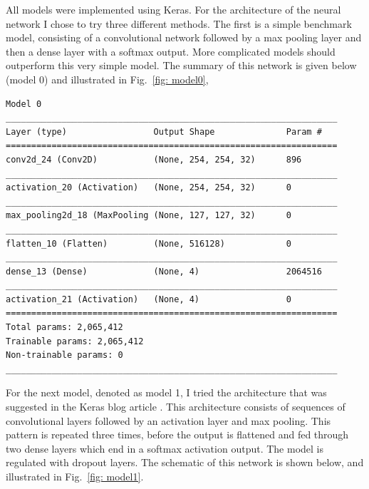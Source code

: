 \documentclass[10pt,a4paper]{article}
\begin{document}
All models were implemented using Keras. For the architecture of the neural network I chose to try three different methods. The first is a simple benchmark model, consisting of a convolutional network followed by a max pooling layer and then a dense layer with a softmax output. More complicated models should outperform this very simple model. The summary of this network is given below (model 0) and illustrated in Fig.~\ref{fig: model0},\\
\begin{lstlisting}
Model 0
_________________________________________________________________
Layer (type)                 Output Shape              Param #   
=================================================================
conv2d_24 (Conv2D)           (None, 254, 254, 32)      896       
_________________________________________________________________
activation_20 (Activation)   (None, 254, 254, 32)      0         
_________________________________________________________________
max_pooling2d_18 (MaxPooling (None, 127, 127, 32)      0         
_________________________________________________________________
flatten_10 (Flatten)         (None, 516128)            0         
_________________________________________________________________
dense_13 (Dense)             (None, 4)                 2064516   
_________________________________________________________________
activation_21 (Activation)   (None, 4)                 0         
=================================================================
Total params: 2,065,412
Trainable params: 2,065,412
Non-trainable params: 0
_________________________________________________________________
\end{lstlisting}

For the next model, denoted as model 1, I tried the architecture that was suggested in the Keras blog article \cite{Chollet_2016}. This architecture consists of sequences of convolutional layers followed by an activation layer and max pooling. This pattern is repeated three times, before the output is flattened and fed through two dense layers which end in a softmax activation output. The model is regulated with dropout layers. The schematic of this network is shown below, and illustrated in Fig.~\ref{fig: model1}.
\end{document}
